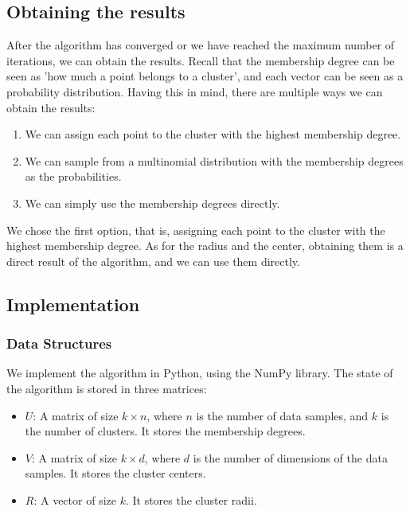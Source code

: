 \documentclass[conference]{IEEEtran}
\begin{document}
\subsection{Obtaining the results}
After the algorithm has converged or we have reached the maximum number of iterations, we can obtain the results.
Recall that the membership degree can be seen as 'how much a point belongs to a cluster', and each vector can be seen as a probability distribution.
Having this in mind, there are multiple ways we can obtain the results:
\begin{enumerate}
    \item We can assign each point to the cluster with the highest membership degree.
    \item We can sample from a multinomial distribution with the membership degrees as the probabilities.
    \item We can simply use the membership degrees directly.
\end{enumerate}
We chose the first option, that is, assigning each point to the cluster with the highest membership degree.
As for the radius and the center, obtaining them is a direct result of the algorithm, and we can use them directly.

\subsection{Implementation}
\subsubsection{Data Structures}
We implement the algorithm in Python, using the NumPy library. The state of the algorithm is stored in three matrices:
\begin{itemize}
    \item $U$: A matrix of size $k \times n$, where $n$ is the number of data samples, and $k$ is the number of clusters. It stores the membership degrees.
    \item $V$: A matrix of size $k \times d$, where $d$ is the number of dimensions of the data samples. It stores the cluster centers.
    \item $R$: A vector of size $k$. It stores the cluster radii.
\end{itemize}
\end{document}

